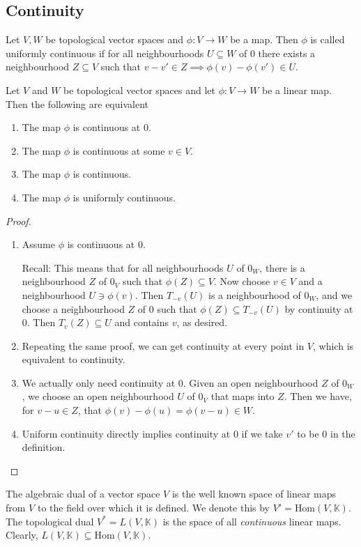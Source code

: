 \documentclass[prb,12pt]{revtex4-2}
\theoremstyle{definition}
\theoremstyle{definition}
\theoremstyle{definition}
\newenvironment{parts}{\begin{enumerate}[label=(\alph*)]}{\end{enumerate}}
\begin{document}
	\subsection{Continuity}
	\begin{Definition}
		Let $V,W$ be topological vector spaces and $\phi:V\to W$ be a map. Then $\phi$ is called uniformly continuous if for all neighbourhoods $U\subseteq W$ of $0$ there exists a neighbourhood $Z\subseteq V$ such that $v-v'\in Z\implies \phi(v)-\phi(v')\in U$.
	\end{Definition}
	\begin{Theorem}
		Let $V$ and $W$ be topological vector spaces and let $\phi:V\to W$ be a linear map. Then the following are equivalent
		\begin{parts}
			\item The map $\phi$ is continuous at $0$.
			\item The map $\phi$ is continuous at some $v\in V$.
			\item The map $\phi$ is continuous.
			\item The map $\phi$ is uniformly continuous.
		\end{parts}
	\end{Theorem}
	\begin{proof}
		\begin{enumerate}
			\item Assume $\phi$ is continuous at 0. 
			
			Recall: This means that for all neighbourhoods $U$ of $0_W$, there is a neighbourhood $Z$ of $0_V$ such that $\phi(Z)\subseteq V$. Now choose $v\in V$ and a neighbourhood $U\ni \phi(v)$. Then $T_{-v}(U)$ is a neighbourhood of $0_W$, and we choose a neighbourhood $Z$ of $0$ such that $\phi(Z)\subseteq T_{-v}(U)$ by continuity at $0$. Then $T_v(Z)\subseteq U$ and contains $v$, as desired.
			\item Repeating the same proof, we can get continuity at every point in $V$, which is equivalent to continuity.
			\item We actually only need continuity at 0. Given an open neighbourhood $Z$ of $0_W$, we choose an open neighbourhood $U$ of $0_V$ that maps into $Z$. Then we have, for $v-u\in Z$, that $\phi(v)-\phi(u)=\phi(v-u)\in W$.
			\item Uniform continuity directly implies continuity at 0 if we take $v'$ to be $0$ in the definition. \qedhere
		\end{enumerate}
	\end{proof}
	\begin{Definition}
		The algebraic dual of a vector space $V$ is the well known space of linear maps from $V$ to the field over which it is defined. We denote this by $V'=\text{Hom}(V,\mathbb{K})$. The topological dual $V^*=L(V, \mathbb{K})$ is the space of all \emph{continuous} linear maps. Clearly, $L(V, \mathbb{K})\subseteq \text{Hom}(V,\mathbb{K})$.
	\end{Definition}
\end{document}
